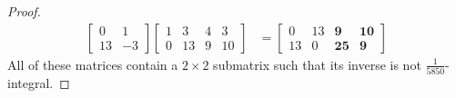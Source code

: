 \documentclass[11pt, a4paper]{article}
\newcommand{\1}{\mathbbm{1}}
\theoremstyle{case}
\begin{document}
\begin{proof}
\begin{align*}
\begin{bmatrix}0 & 1\\ 13 & -3 \end{bmatrix}\begin{bmatrix} 1 & 3 & 4 & 3 \\ 0 & 13 & 9 & 10 \end{bmatrix}&=\begin{bmatrix}0 & 13 & \textbf{9} & \textbf{10}\\ 13 & 0 & \textbf{25} & \textbf{9} \end{bmatrix}
\end{align*}
All of these matrices contain a $2 \times 2$ submatrix such that its inverse is not $\frac{1}{5850}$-integral.
\end{proof} 
\end{document}
